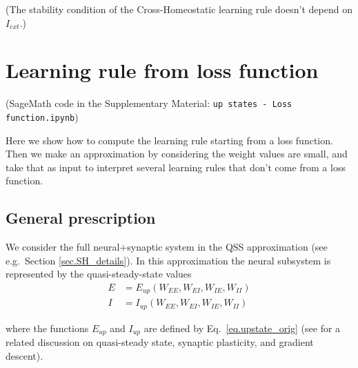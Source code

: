 \documentclass[
twocolumn,
]{article}
\newcommand{\EE}{\mathit{EE}}
\newcommand{\EI}{\mathit{EI}}
\newcommand{\IE}{\mathit{IE}}
\newcommand{\II}{\mathit{II}}
\newcommand{\ext}{\mathit{ext}}
\newcommand{\up}{\mathit{up}}
\begin{document}
\noindent (The stability condition of the Cross-Homeostatic learning rule doesn't depend on $I_{\ext}$.)



\section{Learning rule from loss function}

(SageMath code in the Supplementary Material: {\tt up states - Loss function.ipynb})

Here we show how to compute the learning rule starting from a loss function. Then we make an approximation by considering the weight values are small, and take that as input to interpret several learning rules that don't come from a loss function.


\subsection{General prescription}

We consider the full neural+synaptic system in the QSS approximation (see e.g.\ Section \ref{sec.SH_details}). In this approximation the neural subsystem is represented by the quasi-steady-state values
\begin{equation}
\begin{aligned}
E & = E_{\up}(W_{\EE},W_{\EI},W_{\IE},W_{\II}) \\
I & = I_{\up}(W_{\EE},W_{\EI},W_{\IE},W_{\II})
\label{eq.LF_EIup}
\end{aligned}
\end{equation}

\noindent where the functions $E_{\up}$ and $I_{\up}$ are defined by Eq.\ \ref{eq.upstate_orig} (see \cite{Mackwood2020} for a related discussion on quasi-steady state, synaptic plasticity, and gradient descent).
\end{document}

